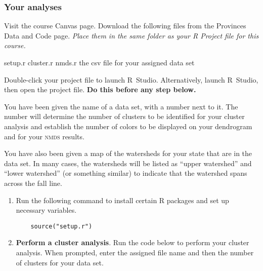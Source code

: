\documentclass[11pt]{article}
\begin{document}
\subsubsection*{Your analyses}

Visit the course Canvas page.  Download the following files from the Provinces Data and Code page. \emph{Place them in the same folder as your R Project file for this course.}


\hspace*{1em} setup.r \newline
\hspace*{1em} cluster.r\newline
\hspace*{1em} nmds.r \newline
\hspace*{1em} the csv file for your assigned data set 


Double-click your project file to launch R~Studio. Alternatively, launch R~Studio, then open the project file. \textbf{Do this before any step below.}


You have been given the name of a data set, with a number next to it. The number will determine  the number of clusters to be identified for your cluster analysis and establish the number
of colors to be displayed on your dendrogram and for your \textsc{nmds} results. 

You have also been given a map of the watersheds for your state that are in the data set. In many cases, the watersheds will be listed as “upper watershed” and “lower watershed” (or something similar) to indicate that the watershed spans across the fall line.

\begin{enumerate}[resume]
\item Run the following command to install certain R packages and set up necessary variables.%

\begin{verbatim}
	source("setup.r")
\end{verbatim}


\item \textbf{Perform a cluster analysis}. Run the code below to perform your cluster analysis. When prompted, enter the assigned file name and then the number of clusters for your data set.
\end{enumerate}
\end{document}
